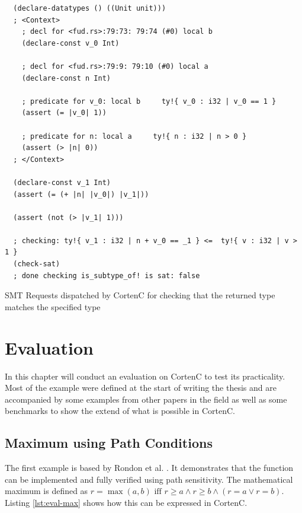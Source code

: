 \documentclass[twoside, english]{sdqthesis}
\theoremstyle{definition}
\begin{document}
\begin{listing}[h]
  \begin{verbatim}
  (declare-datatypes () ((Unit unit)))
  ; <Context>
    ; decl for <fud.rs>:79:73: 79:74 (#0) local b
    (declare-const v_0 Int)
    
    ; decl for <fud.rs>:79:9: 79:10 (#0) local a
    (declare-const n Int)
    
    ; predicate for v_0: local b     ty!{ v_0 : i32 | v_0 == 1 }
    (assert (= |v_0| 1))
    
    ; predicate for n: local a     ty!{ n : i32 | n > 0 }
    (assert (> |n| 0))
  ; </Context>

  (declare-const v_1 Int)
  (assert (= (+ |n| |v_0|) |v_1|))
  
  (assert (not (> |v_1| 1)))
  
  ; checking: ty!{ v_1 : i32 | n + v_0 == _1 } <=  ty!{ v : i32 | v > 1 }
  (check-sat)
  ; done checking is_subtype_of! is sat: false
  \end{verbatim}
  \caption{SMT Requests dispatched by CortenC for checking that the returned type matches the specified type}
  \label{lst:smt-sample-output}
\end{listing}


\chapter{Evaluation} \label{ch:evaluation}

In this chapter will conduct an evaluation on CortenC to test its practicality. 
Most of the example were defined at the start of writing the thesis and are accompanied by some examples from other papers in the field as well as some benchmarks to show the extend of what is possible in CortenC.

\section{Maximum using Path Conditions}\label{sec:eval-max}

The first example is based by Rondon et al. \cite{rondon_liquid_2008}. It demonstrates that the  function can be implemented and fully verified using path sensitivity. The mathematical maximum is defined as $r = \max(a, b) \text{ iff } r \geq a \wedge r \geq b \wedge (r = a \vee r = b)$. Listing \ref{lst:eval-max} shows how this can be expressed in CortenC.
\end{document}
